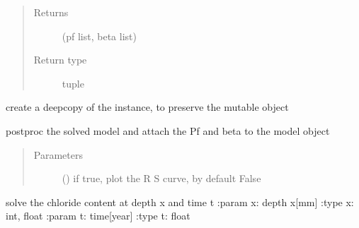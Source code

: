 \documentclass[letterpaper,10pt,english]{sphinxmanual}
\begin{document}
\begin{fulllineitems}
\begin{fulllineitems}
\begin{quote}
\begin{description}
\begin{itemize}
\end{itemize}

\item[{Returns}] \leavevmode
\sphinxAtStartPar
(pf list, beta list)

\item[{Return type}] \leavevmode
\sphinxAtStartPar
tuple

\end{description}\end{quote}

\end{fulllineitems}


\begin{fulllineitems}
\label{\detokenize{chloride:chloride.Chloride_Model.copy}}
\sphinxAtStartPar
create a deepcopy of the instance, to preserve the mutable object

\end{fulllineitems}


\begin{fulllineitems}
\label{\detokenize{chloride:chloride.Chloride_Model.postproc}}
\sphinxAtStartPar
postproc the solved model and attach the Pf and beta to the model object
\begin{quote}\begin{description}
\item[{Parameters}] \leavevmode
\sphinxAtStartPar
{} (\sphinxstyleliteralemphasis{\sphinxupquote{, }}) \textendash{} if true, plot the R S curve, by default False

\end{description}\end{quote}

\end{fulllineitems}


\begin{fulllineitems}
\label{\detokenize{chloride:chloride.Chloride_Model.run}}
\sphinxAtStartPar
solve the chloride content at depth x and time t
:param x: depth x{[}mm{]}
:type x: int, float
:param t: time{[}year{]}
:type t: float

\end{fulllineitems}


\end{fulllineitems}
\end{document}
